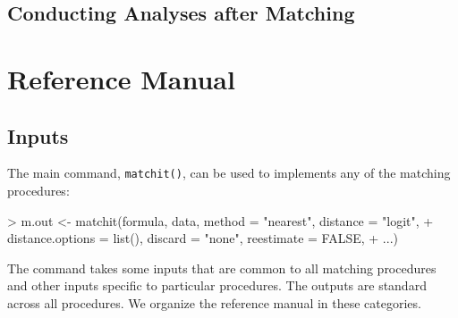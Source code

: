\documentclass[oneside,letterpaper,titlepage]{article}
\begin{document}
%
%



\subsection{Conducting Analyses after Matching}
\label{subsec:analysis}





\section{Reference Manual}
\label{sec:reference}

\subsection{Inputs}
\label{subsec:inputs}

The main command, \texttt{matchit()}, can be used to implements any of
the matching procedures:
\begin{Schunk}
\begin{Sinput}
> m.out <- matchit(formula, data, method = "nearest", distance = "logit", 
+     distance.options = list(), discard = "none", reestimate = FALSE, 
+     ...)
\end{Sinput}
\end{Schunk}
The command takes some inputs that are common to all matching
procedures and other inputs specific to particular procedures.  The
outputs are standard across all procedures.  We organize the reference
manual in these categories.
\end{document}
